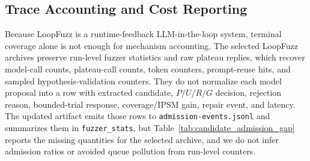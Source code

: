 \documentclass[final,5p,times,number]{elsarticle}
\begin{document}
\subsection{Trace Accounting and Cost Reporting}
\label{sec:trace_accounting}
Because LoopFuzz is a runtime-feedback LLM-in-the-loop system, terminal coverage alone is not enough for mechanism accounting. The selected LoopFuzz archives preserve run-level fuzzer statistics and raw plateau replies, which recover model-call counts, plateau-call counts, token counters, prompt-reuse hits, and sampled hypothesis-validation counters. They do not normalize each model proposal into a row with extracted candidate, $P/U/R/G$ decision, rejection reason, bounded-trial response, coverage/IPSM gain, repair event, and latency. The updated artifact emits those rows to \texttt{admission-events.jsonl} and summarizes them in \texttt{fuzzer\_stats}, but Table~\ref{tab:candidate_admission_gap} reports the missing quantities for the selected archive, and we do not infer admission ratios or avoided queue pollution from run-level counters.

\begin{table}[!t]
\centering
\caption{Candidate-level admission-accounting gaps}
\label{tab:candidate_admission_gap}
{\scriptsize
\setlength{\tabcolsep}{3.2pt}
\renewcommand{\arraystretch}{1.04}
}
\end{table}
\end{document}
